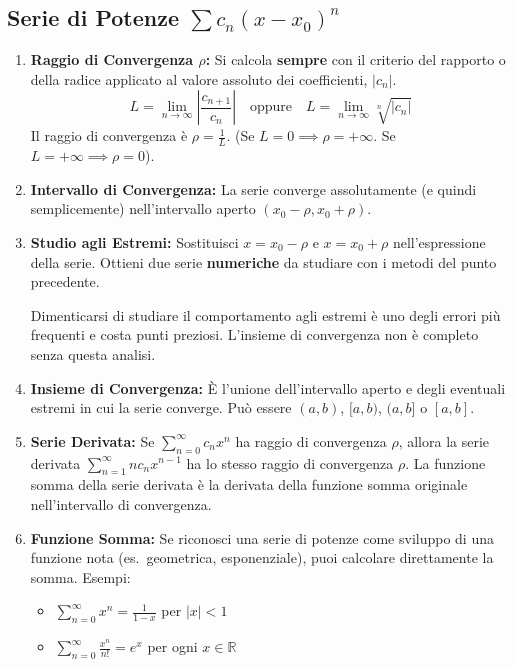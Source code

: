 \documentclass[a4paper, 12pt]{article}
\begin{document}
\subsection{Serie di Potenze \texorpdfstring{$\sum c_n (x-x_0)^n$}{Serie di Potenze}}
\begin{enumerate}
    \item \textbf{Raggio di Convergenza $\rho$:} Si calcola \textbf{sempre} con il criterio del rapporto o della radice applicato al valore assoluto dei coefficienti, $|c_n|$. 
    \[ L = \lim_{n \to \infty} \left|\frac{c_{n+1}}{c_n}\right| \quad \text{oppure} \quad L = \lim_{n \to \infty} \sqrt[n]{|c_n|} \]
    Il raggio di convergenza è $\rho = \frac{1}{L}$. (Se $L=0 \implies \rho=+\infty$. Se $L=+\infty \implies \rho=0$). 
    \item \textbf{Intervallo di Convergenza:} La serie converge assolutamente (e quindi semplicemente) nell'intervallo aperto $(x_0 - \rho, x_0 + \rho)$. 
    \item \textbf{Studio agli Estremi:} Sostituisci $x = x_0 - \rho$ e $x = x_0 + \rho$ nell'espressione della serie. Ottieni due serie \textbf{numeriche} da studiare con i metodi del punto precedente. 
    \begin{errore}
    Dimenticarsi di studiare il comportamento agli estremi è uno degli errori più frequenti e costa punti preziosi. L'insieme di convergenza non è completo senza questa analisi. 
    \end{errore}
    \item \textbf{Insieme di Convergenza:} È l'unione dell'intervallo aperto e degli eventuali estremi in cui la serie converge. Può essere \((a,b)\), \([a,b)\), \((a,b]\) o \([a,b]\). 
    \item \textbf{Serie Derivata:} Se \(\sum_{n=0}^{\infty} c_n x^n\) ha raggio di convergenza \(\rho\), allora la serie derivata \(\sum_{n=1}^{\infty} n c_n x^{n-1}\) ha lo stesso raggio di convergenza \(\rho\). La funzione somma della serie derivata è la derivata della funzione somma originale nell'intervallo di convergenza.
    \item \textbf{Funzione Somma:} Se riconosci una serie di potenze come sviluppo di una funzione nota (es.\ geometrica, esponenziale), puoi calcolare direttamente la somma. Esempi:
    \begin{itemize}
        \item \(\sum_{n=0}^{\infty} x^n = \frac{1}{1-x}\) per \(|x| < 1\)
        \item \(\sum_{n=0}^{\infty} \frac{x^n}{n!} = e^x\) per ogni \(x \in \mathbb{R}\)
    \end{itemize}
\end{enumerate}
\end{document}
